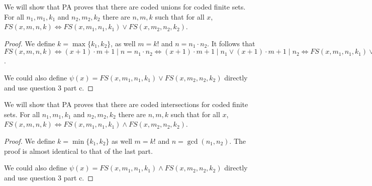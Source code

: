 \subquestion{}
We will show that PA proves that there are coded unions for coded finite sets.
For all $n_1, m_1, k_1$ and $n_2, m_2, k_2$ there are $n, m, k$ such that for all $x$, $FS(x, m, n, k) \iff FS(x, m_1, n_1, k_1) \lor FS(x, m_2, n_2, k_2)$.
\begin{proof}
	We define $k = \max\{k_1, k_2\}$, as well $m = k! $ and $n = n_1 \cdot n_2$.
	It follows that $FS(x, m, n, k) \iff (x + 1) \cdot m + 1 \mid n = n_1 \cdot n_2 \iff (x + 1) \cdot m + 1 \mid n_1 \lor (x + 1) \cdot m + 1 \mid n_2 \iff FS(x, m_1, n_1, k_1) \lor FS(x, m_2, n_2, k_2)$.

	We could also define $\psi(x) = FS(x, m_1, n_1, k_1) \lor FS(x, m_2, n_2, k_2)$ directly and use question 3 part c.
\end{proof}

\subquestion{}
We will show that PA proves that there are coded intersections for coded finite sets.
For all $n_1, m_1, k_1$ and $n_2, m_2, k_2$ there are $n, m, k$ such that for all $x$, $FS(x, m, n, k) \iff FS(x, m_1, n_1, k_1) \land FS(x, m_2, n_2, k_2)$.
\begin{proof}
	We define $k = \min\{k_1, k_2\}$ as well $m = k! $ and $n = \gcd(n_1, n_2)$.
	The proof is almost identical to that of the last part.

	We could also define $\psi(x) = FS(x, m_1, n_1, k_1) \land FS(x, m_2, n_2, k_2)$ directly and use question 3 part c.
\end{proof}


